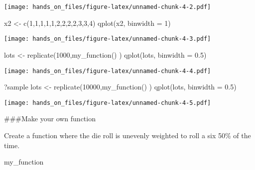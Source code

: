 \documentclass[
]{article}
\newenvironment{Shaded}{\begin{snugshade}}{\end{snugshade}}
\newcommand{\AttributeTok}[1]{\textcolor[rgb]{0.77,0.63,0.00}{#1}}
\newcommand{\DecValTok}[1]{\textcolor[rgb]{0.00,0.00,0.81}{#1}}
\newcommand{\FloatTok}[1]{\textcolor[rgb]{0.00,0.00,0.81}{#1}}
\newcommand{\FunctionTok}[1]{\textcolor[rgb]{0.00,0.00,0.00}{#1}}
\newcommand{\NormalTok}[1]{#1}
\newcommand{\OtherTok}[1]{\textcolor[rgb]{0.56,0.35,0.01}{#1}}
\begin{document}
\texttt{[image: hands\_on\_files/figure-latex/unnamed-chunk-4-2.pdf]}

\begin{Shaded}
\begin{Highlighting}[]
\NormalTok{x2 }\OtherTok{\textless{}{-}} \FunctionTok{c}\NormalTok{(}\DecValTok{1}\NormalTok{,}\DecValTok{1}\NormalTok{,}\DecValTok{1}\NormalTok{,}\DecValTok{1}\NormalTok{,}\DecValTok{1}\NormalTok{,}\DecValTok{2}\NormalTok{,}\DecValTok{2}\NormalTok{,}\DecValTok{2}\NormalTok{,}\DecValTok{2}\NormalTok{,}\DecValTok{3}\NormalTok{,}\DecValTok{3}\NormalTok{,}\DecValTok{4}\NormalTok{)}
\FunctionTok{qplot}\NormalTok{(x2, }\AttributeTok{binwidth =} \DecValTok{1}\NormalTok{)}
\end{Highlighting}
\end{Shaded}

\texttt{[image: hands\_on\_files/figure-latex/unnamed-chunk-4-3.pdf]}

\begin{Shaded}
\begin{Highlighting}[]
\NormalTok{lots }\OtherTok{\textless{}{-}} \FunctionTok{replicate}\NormalTok{(}\DecValTok{1000}\NormalTok{,}\FunctionTok{my\_function}\NormalTok{() )}
\FunctionTok{qplot}\NormalTok{(lots, }\AttributeTok{binwidth =} \FloatTok{0.5}\NormalTok{)}
\end{Highlighting}
\end{Shaded}

\texttt{[image: hands\_on\_files/figure-latex/unnamed-chunk-4-4.pdf]}

\begin{Shaded}
\begin{Highlighting}[]
\NormalTok{?sample}
\NormalTok{lots }\OtherTok{\textless{}{-}} \FunctionTok{replicate}\NormalTok{(}\DecValTok{10000}\NormalTok{,}\FunctionTok{my\_function}\NormalTok{() )}
\FunctionTok{qplot}\NormalTok{(lots, }\AttributeTok{binwidth =} \FloatTok{0.5}\NormalTok{)}
\end{Highlighting}
\end{Shaded}

\texttt{[image: hands\_on\_files/figure-latex/unnamed-chunk-4-5.pdf]}

\#\#\#Make your own function

Create a function where the die roll is unevenly weighted to roll a six
50\% of the time.

\begin{Shaded}
\begin{Highlighting}[]
\NormalTok{my\_function}
\end{Highlighting}
\end{Shaded}
\end{document}
